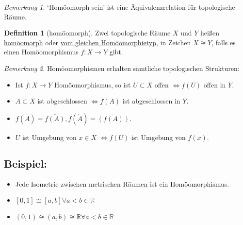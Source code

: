 \documentclass[a4paper,11pt,notitlepage]{report}
\theoremstyle{remark}
\newtheorem{remark}{Bemerkung}[chapter]
\theoremstyle{definition}
\newtheorem{definition}{Definition}[chapter]
\newcommand{\R}{{\ensuremath{\mathbb{R}}}}
\newenvironment{bsp}[1]
{
\setlength{\fboxsep}{10pt}
\subsection*{Beispiel: #1}
\begin{upshape}
}
{
\end{upshape}
}
\begin{document}
\begin{remark}
	`Homöomorph sein' ist eine Äquivalenzrelation für topologische Räume.
\end{remark}

\begin{definition}[homöomorph]
	Zwei topologische Räume $X$ und $Y$ heißen \underline{homöomorph} oder \underline{vom gleichen Homöomorphietyp}, in Zeichen $X \cong Y$, falls es einen Homöomorphismus $f \colon X \rightarrow Y$ gibt.
\end{definition}

\begin{remark}
	Homöomorphismen erhalten sämtliche topologischen Strukturen:
	\begin{itemize}
		\item Ist $f \colon X \rightarrow Y$ Homöomorphismus, so ist $U \subset X$ offen $\Leftrightarrow f(U)$ offen in $Y$.
		\item $A \subset X$ ist abgeschlossen $\Leftrightarrow f(A)$ ist abgeschlossen in $Y$.
		\item $f(\bar{A}) = \overline{f(A)}, f(\mathring A) = \mathring{\left(f(A)\right)}$.
		\item $U$ ist Umgebung von $x \in X$ $\Leftrightarrow f(U)$ ist Umgebung von $f(x)$.
	\end{itemize}
\end{remark}

\begin{bsp}{}
	\begin{itemize}
		\item Jede Isometrie zwischen metrischen Räumen ist ein Homöomorphismus.
		\item $[0,1] \cong [a,b] \forall a < b \in \R$
		\item $(0,1) \cong (a,b) \cong \R \forall a < b \in \R$
	\end{itemize}
\end{bsp}
\end{document}
